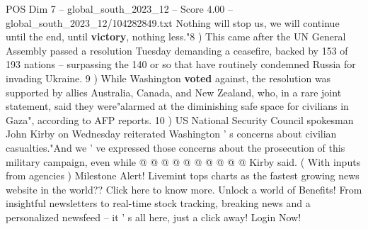 \begin{textsample}{POS Dim 7 – global\_south\_2023\_12 – Score 4.00 – global\_south\_2023\_12/104282849.txt}
Nothing will stop us, we will continue until the end, until \textbf{victory}, nothing less."8 ) This came after the UN General Assembly passed a resolution Tuesday demanding a ceasefire, backed by 153 of 193 nations -- surpassing the 140 or so that have routinely condemned Russia for invading Ukraine. 9 ) While Washington \textbf{voted} against, the resolution was supported by allies Australia, Canada, and New Zealand, who, in a rare joint statement, said they were"alarmed at the diminishing safe space for civilians in Gaza", according to AFP reports. 10 ) US National Security Council spokesman John Kirby on Wednesday reiterated Washington ' s concerns about civilian casualties."And we ' ve expressed those concerns about the prosecution of this military campaign, even while @ @ @ @ @ @ @ @ @ @ Kirby said. ( With inputs from agencies ) Milestone Alert!
Livemint tops charts as the fastest growing news website in the world??
Click here to know more.
Unlock a world of Benefits!
From insightful newsletters to real-time stock tracking, breaking news and a personalized newsfeed -- it ' s all here, just a click away!
Login Now!

\end{textsample}
